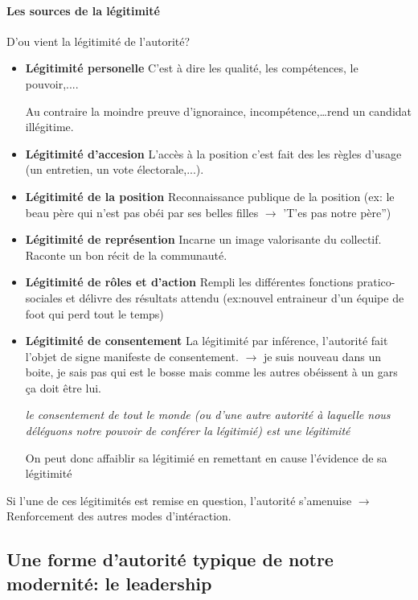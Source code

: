 \documentclass[11pt]{article} %
\begin{document}
\paragraph{Les sources de la légitimité} 

D'ou vient la légitimité de l'autorité? 

\begin{itemize}

 \item \textbf{Légitimité personelle} C'est à dire les qualité, les
compétences, le pouvoir,....

Au contraire la moindre preuve d'ignoraince, incompétence,\ldots rend un
candidat illégitime.
 \item \textbf{Légitimité d'accesion} L'accès à la position c'est fait des
 les règles d'usage (un entretien, un vote électorale,...).

 \item \textbf{Légitimité de la position} Reconnaissance publique de la
 position (ex: le beau père qui n'est pas obéi par ses belles filles
 $\to$ 'T'es pas notre père'')

 \item \textbf{Légitimité de représention} Incarne un image valorisante du
 collectif. Raconte un bon récit de la communauté.

 \item \textbf{Légitimité de rôles et d'action} Rempli les différentes
 fonctions pratico-sociales et délivre des résultats attendu
 (ex:nouvel entraineur d'un équipe de foot qui perd tout le temps)

 \item \textbf{Légitimité de consentement} La légitimité
 par inférence, l'autorité fait l'objet de signe manifeste de
 consentement. 
 $\to$ je suis nouveau dans un boite,
 je sais pas qui est le bosse mais comme les autres obéissent à un
 gars ça doit être lui.

 \textit{le consentement de tout le monde (ou d'une autre
 autorité à laquelle nous déléguons notre pouvoir de conférer la
 légitimié) est une légitimité}

 On peut donc affaiblir sa légitimié en remettant en cause l'évidence de
 sa légitimité

\end{itemize}

Si l'une de ces légitimités est remise en question, l'autorité
s'amenuise $\to$ Renforcement des autres modes d'intéraction.

\subsection{Une forme d'autorité typique de notre modernité: le leadership}
\end{document}
